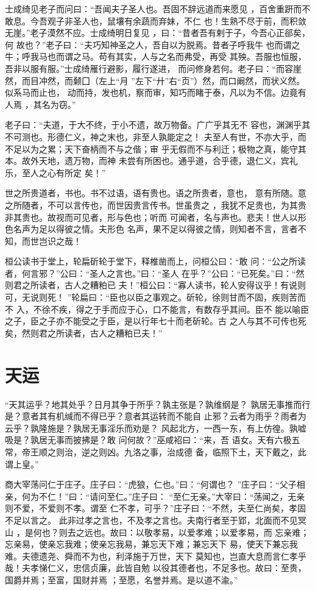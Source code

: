\documentclass[a4paper,12pt,UTF8,twoside]{ctexbook}
\begin{document}
士成绮见老子而问曰：“吾闻夫子圣人也。吾固不辞远道而来愿见 ，百舍重趼而不敢息。今吾观子非圣人也，鼠壤有余蔬而弃妹，不仁 也！生熟不尽于前，而积敛无崖。”老子漠然不应。士成绮明日复见 ，曰：“昔者吾有剌于子，今吾心正郤矣，何 故也？”老子曰：“夫巧知神圣之人，吾自以为脱焉。昔者子呼我牛 也而谓之牛；呼我马也而谓之马。苟有其实，人与之名而弗受，再受 其殃。吾服也恒服，吾非以服有服。”士成绮雁行避影，履行遂进， 而问修身若何。老子曰：“而容崖然，而目冲然，而颡囗（左上“月 ”左下“廾”右“页”）然，而口阚然，而状义然。似系马而止也， 动而持，发也机，察而审，知巧而睹于泰，凡以为不信。边竟有人焉 ，其名为窃。”

老子曰：“夫道，于大不终，于小不遗，故万物备。广广乎其无不 容也，渊渊乎其不可测也。形德仁义，神之末也，非至人孰能定之！ 夫至人有世，不亦大乎，而不足以为之累；天下奋柄而不与之偕；审 乎无假而不与利迁；极物之真，能守其本。故外天地，遗万物，而神 未尝有所困也。通乎道，合乎德，退仁义，宾礼乐，至人之心有所定 矣！”

世之所贵道者，书也。书不过语，语有贵也。语之所贵者，意也， 意有所随。意之所随者，不可以言传也，而世因贵言传书。世虽贵之 ，我犹不足贵也，为其贵非其贵也。故视而可见者，形与色也；听而 可闻者，名与声也。悲夫！世人以形色名声为足以得彼之情。夫形色 名声，果不足以得彼之情，则知者不言，言者不知，而世岂识之哉！

桓公读书于堂上，轮扁斫轮于堂下，释椎凿而上，问桓公曰：“敢 问：“公之所读者，何言邪？”公曰：“圣人之言也。”曰：“圣人 在乎？”公曰：“已死矣。”曰：“然则君之所读者，古人之糟粕已 夫！”桓公曰：“寡人读书，轮人安得议乎！有说则可，无说则死！ ”轮扁曰：“臣也以臣之事观之。斫轮，徐则甘而不固，疾则苦而不 入，不徐不疾，得之于手而应于心，口不能言，有数存乎其间。臣不 能以喻臣之子，臣之子亦不能受之于臣，是以行年七十而老斫轮。古 之人与其不可传也死矣，然则君之所读者，古人之糟粕已夫！”

\section{天运}

“天其运乎？地其处乎？日月其争于所乎？孰主张是？孰维纲是？ 孰居无事推而行是？意者其有机缄而不得已乎？意者其运转而不能自 止邪？云者为雨乎？雨者为云乎？孰隆施是？孰居无事淫乐而劝是？ 风起北方，一西一东，有上仿徨。孰嘘吸是？孰居无事而披拂是？敢 问何故？”巫咸袑曰：“来，吾 语女。天有六极五常，帝王顺之则治，逆之则凶。九洛之事，治成德 备，临照下土，天下戴之，此谓上皇。”

商大宰荡问仁于庄子。庄子曰：“虎狼，仁也。”曰：“何谓也？ ”庄子曰：“父子相亲，何为不仁！”曰：“请问至仁。”庄子曰： “至仁无亲。”大宰曰：“荡闻之，无亲则不爱，不爱则不孝。谓至 仁不孝，可乎？”庄子曰：“不然，夫至仁尚矣，孝固不足以言之。 此非过孝之言也，不及孝之言也。夫南行者至于郢，北面而不见冥山 ，是何也？则去之远也。故曰：以敬孝易，以爱孝难；以爱孝易，而 忘亲难；忘亲易，使亲忘我难；使亲忘我易，兼忘天下难；兼忘天下 易，使天下兼忘我难。夫德遗尧、舜而不为也，利泽施于万世，天下 莫知也，岂直大息而言仁孝乎哉！夫孝悌仁义，忠信贞廉，此皆自勉 以役其德者也，不足多也。故曰：至贵，国爵并焉；至富，国财并焉 ；至愿，名誉并焉。是以道不渝。”
\end{document}
